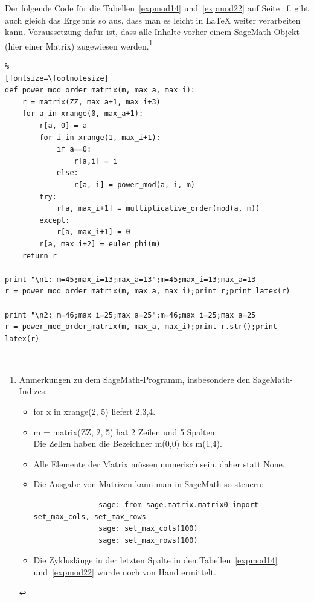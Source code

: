 \begin{refsegment}
\hypertarget{nt:AppArith3d}{}
\label{nt:AppArith3d}{}
Der folgende Code für die Tabellen~\ref{expmod14} und~\ref{expmod22}
auf Seite~\pageref{expmod14} f. gibt auch gleich das Ergebnis so aus,
dass man es leicht in LaTeX weiter verarbeiten kann. Voraussetzung dafür ist,
dass alle Inhalte vorher einem SageMath-Objekt (hier einer Matrix) zugewiesen
werden.\footnote{%
        Anmerkungen zu dem SageMath-Programm, insbesondere den
        SageMath-Indizes:
        \begin{itemize}[nosep,label=-]
         \item for x in xrange(2, 5) liefert 2,3,4.
         \item m = matrix(ZZ, 2, 5) hat 2 Zeilen und 5 Spalten.\\
               Die Zellen haben die Bezeichner m(0,0) bis m(1,4).
         \item Alle Elemente der Matrix müssen numerisch sein, daher \grqq
               statt \glqq None\grqq.
         \item Die Ausgabe von Matrizen kann man in SageMath so steuern:
\begin{Verbatim}
               sage: from sage.matrix.matrix0 import set_max_cols, set_max_rows
               sage: set_max_cols(100)
               sage: set_max_rows(100)
\end{Verbatim}
         \item Die Zykluslänge in der letzten Spalte in den
               Tabellen~\ref{expmod14} und~\ref{expmod22}
               wurde noch von Hand ermittelt.
        \end{itemize}
        }

\begin{sagecode}
\begin{Verbatim}%
[fontsize=\footnotesize]
def power_mod_order_matrix(m, max_a, max_i):
    r = matrix(ZZ, max_a+1, max_i+3)
    for a in xrange(0, max_a+1):
        r[a, 0] = a
        for i in xrange(1, max_i+1):
            if a==0:
                r[a,i] = i
            else:
                r[a, i] = power_mod(a, i, m)
        try:
            r[a, max_i+1] = multiplicative_order(mod(a, m))
        except:
            r[a, max_i+1] = 0
        r[a, max_i+2] = euler_phi(m)
    return r

print "\n1: m=45;max_i=13;max_a=13";m=45;max_i=13;max_a=13
r = power_mod_order_matrix(m, max_a, max_i);print r;print latex(r)

print "\n2: m=46;max_i=25;max_a=25";m=46;max_i=25;max_a=25
r = power_mod_order_matrix(m, max_a, max_i);print r.str();print latex(r)


\end{Verbatim}
\end{sagecode}
\end{refsegment}
